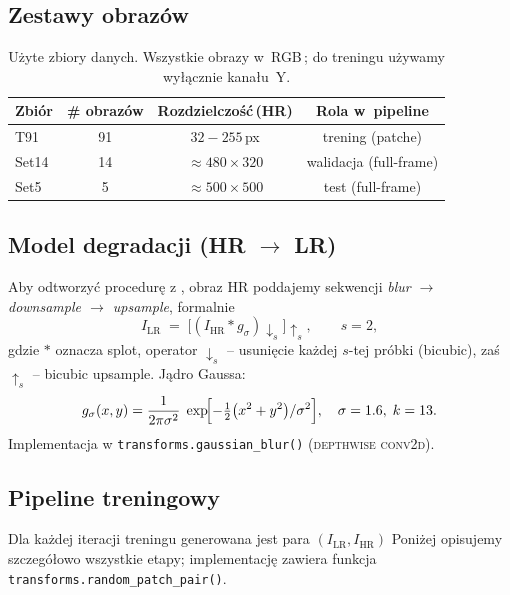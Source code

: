 \documentclass[11pt]{article}
\begin{document}
\subsection{Zestawy obrazów}

\begin{table}[h]
\centering
\begin{tabular}{@{}lccc@{}}
\toprule
Zbiór   & \# obrazów & Rozdzielczość\,(HR) & Rola w~pipeline \\ \midrule
T91     & 91 & $32\!-\!255$\,px & trening (patche) \\
Set14   & 14 & $\approx 480\!\times\!320$ & walidacja (full-frame) \\
Set5    & 5  & $\approx 500\!\times\!500$ & test (full-frame) \\ \bottomrule
\end{tabular}
\caption{Użyte zbiory danych.  Wszystkie obrazy w~RGB\,; do treningu używamy wyłącznie kanału~Y.}
\label{tab:datasets}
\end{table}


\subsection{Model degradacji (HR $\rightarrow$ LR)}
\label{sec:data_degradation}

Aby odtworzyć procedurę z
, obraz HR poddajemy sekwencji
\emph{blur $\rightarrow$ downsample $\rightarrow$ upsample}, formalnie
\[
I_\mathrm{LR} \;=\;
\bigl[(I_\mathrm{HR} * g_\sigma) \downarrow_s\bigr]\!\uparrow_s ,
\qquad s = 2,
\]
gdzie $*$ oznacza splot, operator $\downarrow_s$ – usunięcie każdej
$s$-tej próbki (bicubic), zaś $\uparrow_s$ – bicubic upsample.  
Jądro Gaussa:
\begin{equation}
g_\sigma(x,y)=\frac{1}{2\pi\sigma^{2}}\;
  \exp\!\Bigl[-\tfrac12\bigl(x^{2}+y^{2}\bigr)/\sigma^{2}\Bigr],
\quad
\sigma=1.6,\; k=13.
\end{equation}
Implementacja w \texttt{transforms.gaussian\_blur()} (\textsc{depthwise conv2d}).

\subsection{Pipeline treningowy}
\label{sec:data_pipeline}

Dla każdej iteracji treningu generowana jest para
\((I_\mathrm{LR}, I_\mathrm{HR})\)
Poniżej opisujemy szczegółowo wszystkie
etapy; implementację zawiera funkcja
\texttt{transforms.random\_patch\_pair()}.
\end{document}
